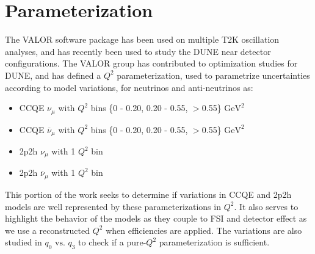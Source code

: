 \documentclass[12pt]{article}
\begin{document}
\section{Parameterization}
The VALOR software package has been used on multiple T2K oscillation analyses, and has recently been used to study the DUNE near detector configurations. %
The VALOR group has contributed to optimization studies for DUNE\cite{VALOR}, and has defined a $Q^2$ parameterization, used to parametrize uncertainties according to model variations, for neutrinos and anti-neutrinos as: 
\begin{itemize}
\item CCQE $\nu_{\mu}$ with $Q^2$ bins \{0 - 0.20, 0.20 - 0.55, $>$0.55\} $\textrm{GeV}^2$
\item CCQE $\overline{\nu}_{\mu}$ with $Q^2$ bins \{0 - 0.20, 0.20 - 0.55, $>$0.55\} $\textrm{GeV}^2$
\item 2p2h $\nu_{\mu}$ with 1 $Q^2$ bin 
\item 2p2h $\overline{\nu}_{\mu}$ with 1 $Q^2$ bin
\end{itemize}

This portion of the work seeks to determine if variations in CCQE and 2p2h models are well represented by these parameterizations in $Q^2$. It also serves to highlight the behavior of the models as they couple to FSI and detector effect as we use a reconstructed $Q^2$ when efficiencies are applied. The variations are also studied in $q_0 \textrm{ vs. } q_3$ to check if a pure-$Q^2$ parameterization is sufficient.
\end{document}
